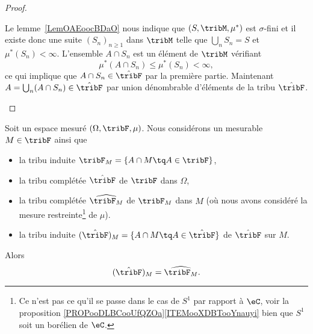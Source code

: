 \begin{proof}
\begin{subproof}
		\spitem[Si \( \mu^*(A)=\infty\)]

		Le lemme~\ref{LemOAEoocBDaO} nous indique que \( (S,\tribM,\mu^*)\) est \( \sigma\)-fini et il existe donc une suite \( (S_n)_{n\geq 1}\) dans \( \tribM\) telle que \( \bigcup_nS_n=S\) et \( \mu^*(S_n)<\infty\). L'ensemble \( A\cap S_n\) est un élément de \( \tribM\) vérifiant
		\begin{equation}
			\mu^*(A\cap S_n)\leq \mu^*(S_n)<\infty,
		\end{equation}
		ce qui implique que \( A\cap S_n\in\hat\tribF\) par la première partie. Maintenant \( A=\bigcup_n(A\cap S_n)\in\hat\tribF\) par union dénombrable d'éléments de la tribu \( \hat\tribF\).
	\end{subproof}
\end{proof}

\begin{proposition} \label{PROPooAMIEooRomnMG}
	Soit un espace mesuré \( (\Omega,\tribF,\mu)\). Nous considérons un mesurable \( M\in \tribF\) ainsi que
	\begin{itemize}
		\item
		      la tribu induite    \( \tribF_M=\{ A\cap M\tq A\in \tribF \}\),
		\item
		      la tribu complétée  \( \hat\tribF\) de \( \tribF\) dans \( \Omega\),
		\item
		      la tribu complétée  \( \widehat{\tribF_M}\) de \( \tribF_M\) dans \( M\) (où nous avons considéré la mesure restreinte\footnote{Ce n'est pas ce qu'il se passe dans le cas de \( S^1\) par rapport à \( \eC\), voir la proposition \ref{PROPooDLBCooUfQZOa}\ref{ITEMooXDBTooYnauyi} bien que \( S^1\) soit un borélien de \( \eC\).} de \( \mu\)).
		\item
		      la tribu induite    \( (\hat\tribF)_M=\{ A\cap M\tq A\in \hat\tribF \}\) de \( \hat\tribF\) sur \( M\).
	\end{itemize}
	Alors
	\begin{equation}
		(\hat\tribF)_M=\widehat{\tribF_M}.
	\end{equation}
\end{proposition}

